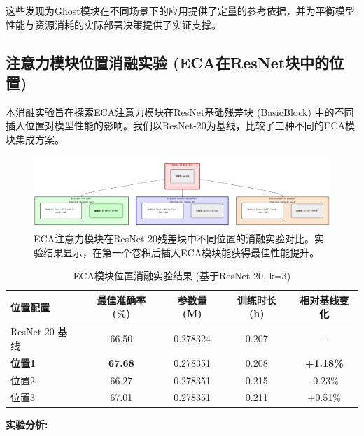 \documentclass[a4paper]{article}
\begin{document}
这些发现为Ghost模块在不同场景下的应用提供了定量的参考依据，并为平衡模型性能与资源消耗的实际部署决策提供了实证支撑。

\subsection{注意力模块位置消融实验 (ECA在ResNet块中的位置)}
本消融实验旨在探索ECA注意力模块在ResNet基础残差块 (BasicBlock) 中的不同插入位置对模型性能的影响。我们以ResNet-20为基线，比较了三种不同的ECA模块集成方案。

\begin{figure}[H]
    \centering
    \includegraphics[width=\textwidth]{fig/3.png}
    \caption{ECA注意力模块在ResNet-20残差块中不同位置的消融实验对比。实验结果显示，在第一个卷积后插入ECA模块能获得最佳性能提升。}
    \label{fig:eca_position_ablation}
\end{figure}

\begin{table}[H]
\centering
\caption{ECA模块位置消融实验结果 (基于ResNet-20, k=3)}
\label{tab:eca_position_ablation}
\begin{tabular}{lcccc}
\toprule
\textbf{位置配置} & \textbf{最佳准确率 (\%)} & \textbf{参数量 (M)} & \textbf{训练时长 (h)} & \textbf{相对基线变化} \\
\midrule
ResNet-20 基线 & 66.50 & 0.278324 & 0.207 & - \\
\textbf{位置1} & \textbf{67.68} & 0.278351 & 0.208 & \textbf{+1.18\%} \\
位置2 & 66.27 & 0.278351 & 0.215 & -0.23\% \\
位置3 & 67.01 & 0.278351 & 0.211 & +0.51\% \\
\bottomrule
\end{tabular}
\end{table}

\textbf{实验分析:}
\end{document}
